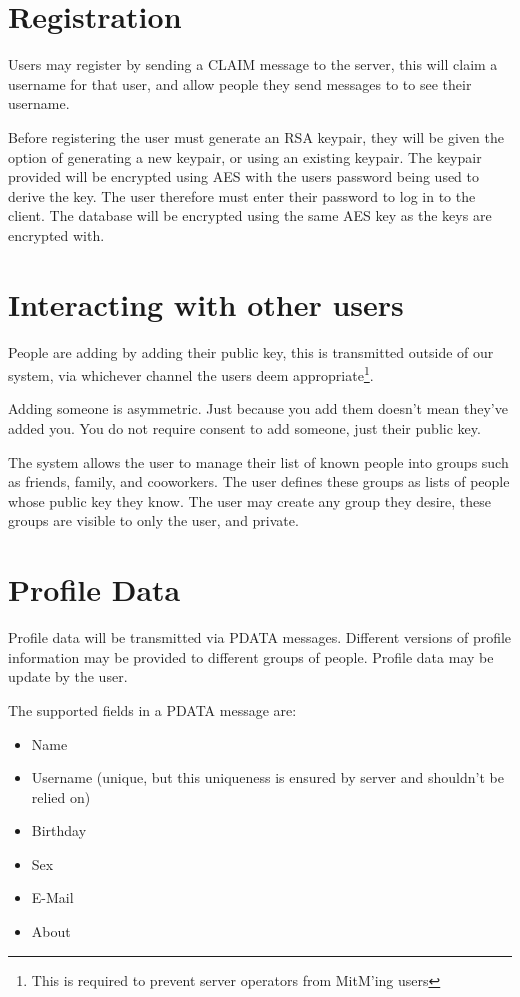 
\section{Registration}
Users may register by sending a CLAIM message to the server, this will claim a
username for that user, and allow people they send messages to to see their
username.

Before registering the user must generate an RSA keypair, they will be given the
option of generating a new keypair, or using an existing keypair. The keypair
provided will be encrypted using AES with the users password being used to
derive the key. The user therefore must enter their password to log in to the
client. The database will be encrypted using the same AES key as the keys are
encrypted with.

\section{Interacting with other users}
People are adding by adding their public key, this is transmitted outside of our
system, via whichever channel the users deem appropriate\footnote{This is
required to prevent server operators from MitM'ing users}.

Adding someone is asymmetric. Just because you add them doesn't mean they've
added you. You do not require consent to add someone, just their public key.
    
The system allows the user to manage their list of known people into groups such
as friends, family, and cooworkers. The user defines these groups as lists of
people whose public key they know. The user may create any group they desire,
these groups are visible to only the user, and private.

\section{Profile Data}
Profile data will be transmitted via PDATA messages. Different versions of
profile information may be provided to different groups of people. Profile data
may be update by the user.

The supported fields in a PDATA message are:
    \begin{itemize}
        \item Name
        \item Username (unique, but this uniqueness is ensured by server and
              shouldn't be relied on)
        \item Birthday
        \item Sex
        \item E-Mail
        \item About
    \end{itemize}

